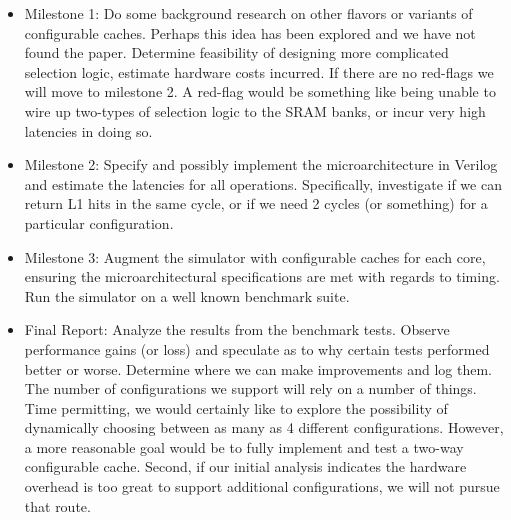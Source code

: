 \documentclass[pageno]{jpaper}
\begin{document}
\begin{itemize}
\item Milestone 1: Do some background research on other flavors or variants of configurable caches. Perhaps this idea has been explored and we have not found the paper. Determine feasibility of designing more complicated selection logic, estimate hardware costs incurred. If there are no red-flags we will move to milestone 2. A red-flag would be something like being unable to wire up two-types of selection logic to the SRAM banks, or incur very high latencies in doing so.\\

\item Milestone 2: Specify and possibly implement the microarchitecture in Verilog and estimate the latencies for all operations. Specifically, investigate if we can return L1 hits in the same cycle, or if we need 2 cycles (or something) for a particular configuration.\\

\item Milestone 3: Augment the simulator with configurable caches for each core, ensuring the microarchitectural specifications are met with regards to timing. Run the simulator on a well known benchmark suite.\\

\item Final Report: Analyze the results from the benchmark tests. Observe performance gains (or loss) and speculate as to why certain tests performed better or worse. Determine where we can make improvements and log them.\\

The number of configurations we support will rely on a number of things. Time permitting, we would certainly like to explore the possibility of dynamically choosing between as many as 4 different configurations. However, a more reasonable goal would be to fully implement and test a two-way configurable cache. Second, if our initial analysis indicates the hardware overhead is too great to support additional configurations, we will not pursue that route.

\end{itemize}
\end{document}
